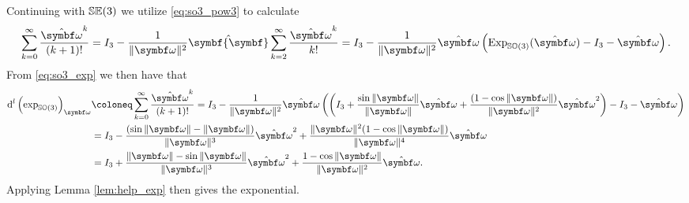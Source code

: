 Continuing with ${\mathbb{SE}(3)}$ we utilize \eqref{eq:so3_pow3} to calculate
\begin{equation}
  \sum\limits_{k=0}^\infty \frac{\hat{\bomega}^{k}} {(k+1)!} = I_3 - \frac{1}{\| \symbf\omega \|^2} \hat {\symbf{\symbf}} \sum\limits_{k=2}^\infty \frac{\hat{\bomega}^k}{k!} = I_3  - \frac{1}{\| \symbf\omega \|^2} \hat {\bomega} \left( \Exp_\SOthree(\hat {\bomega}) - I_3 - \hat{\bomega} \right).
\end{equation}
From \eqref{eq:so3_exp} we then have that
\begin{equation}
  \label{eq:so3_leftjac}
  \begin{aligned}
    \mathrm{d}^l \left( \exp_{\SOthree} \right)_\bomega
     & \coloneq \sum\limits_{k=0}^\infty \frac{\hat{\bomega}^{k}} {(k+1)!} = I_3  - \frac{1}{\| \bomega \|^2} \hat {\bomega} \left( \left( I_3 + \frac{ \sin \| \bomega \|}{\| \bomega \|} \hat{\bomega} + \frac{ (1 - \cos \| \bomega \|)}{\| \bomega \|^2} \hat{\bomega}^2 \right) - I_3 - \hat{\bomega} \right)
    \\
     & = I_3 - \frac{ (\sin \| \bomega \| -\| \bomega \|)  }{\| \bomega\|^3} \hat {\bomega}^2 + \frac{\| \bomega \|^2  (1 - \cos \| \bomega \| ) }{\| \bomega \|^4} \hat {\bomega}
    \\
     & = I_3 + \frac{ \| \bomega \| - \sin \| \bomega \| }{\| \bomega\|^3} \hat {\bomega}^2 + \frac{1 - \cos \| \bomega \|}{\| \bomega \|^2} \hat {\bomega} .
  \end{aligned}
\end{equation}
Applying Lemma \ref{lem:help_exp} then gives the exponential.
